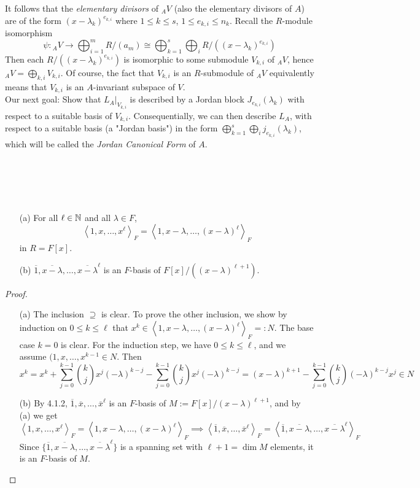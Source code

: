 \documentclass[11pt]{book}
\theoremstyle{definition}   \newtheorem{defn}[counter]{Definition} %
\newcommand{\ov}{\overline}   \newcommand{\wt}{\widetilde}
\newcommand{\gen}[1]{\left\langle #1 \right\rangle}   \newcommand{\stab}[2]{\tn{Stab}_{#1}(#2)}   \newcommand{\fix}[2]{\tn{Fix}_{#1}(#2)}   \newcommand{\op}{^{\tn{op}}}
\DeclareMathOperator{\ra}{\rightarrow}   \DeclareMathOperator{\Poly}{\mathbf{P}}   \DeclareMathOperator{\spn}{\textnormal{span}}   \DeclareMathOperator{\aut}{\textnormal{Aut}}
\newcommand{\vs}{\vspace{8pt}}
\numberwithin{counter}{chapter}
\begin{document}
It follows that the \emph{elementary divisors} of ${_AV}$ (also the elementary divisors of $A$) are of the form $(x-\lambda_k)^{e_{k,i}}$ where $1 \leq k \leq s$, $1 \leq e_{k,i} \leq n_k$. Recall the $R$-module isomorphism 
	\[\psi : {_AV} \ra \bigoplus_{i=1}^m R/(a_m) \cong \bigoplus_{k=1}^s \bigoplus_{i} R/((x-\lambda_k)^{e_{k,i}}) \]
Then each $R/((x-\lambda_k)^{e_{k,i}})$ is isomorphic to some submodule $V_{k,i}$ of ${_AV}$, hence ${_AV} = \bigoplus_{k,i} V_{k,i}$. Of course, the fact that $V_{k,i}$ is an $R$-submodule of ${_AV}$ equivalently means that $V_{k,i}$ is an $A$-invariant subspace of $V$. \\

Our next goal: Show that $L_A|_{V_{k,i}}$ is described by a Jordan block $J_{e_{k,i}}(\lambda_k)$ with respect to a suitable basis of $V_{k,i}$. Consequentially, we can then describe $L_A$, with respect to a suitable basis (a "Jordan basis") in the form $\bigoplus_{k=1}^s \bigoplus_i j_{e_{k,i}}(\lambda_k)$, which will be called the \emph{Jordan Canonical Form} of $A$. 

\vs \vs \ \\ \ \\

\begin{lemma}\ 
\begin{enumerate}
\item[(a)] For all $\ell \in \operatorname{\mathbb{N}}$ and all $\lambda \in F$, 
	\[\gen{1,x,\dots,x^\ell}_F = \gen{1,x-\lambda,\dots,(x-\lambda)^\ell}_F \]
in $R = F[x]$.
\item[(b)] $\ov{1},\ov{x-\lambda},\dots,\ov{x-\lambda}^\ell$ is an $F$-basis of $F[x]/((x-\lambda)^{\ell+1})$. 
\end{enumerate}
\end{lemma}

\begin{proof} \ 
\begin{enumerate}
\item[(a)] The inclusion $\supseteq$ is clear. To prove the other inclusion, we show by induction on $0 \leq k \leq \ell$ that $x^k \in \gen{1,x-\lambda,\dots,(x-\lambda)^\ell}_F =: N$. The base case $k = 0$ is clear. For the induction step, we have $0 \leq k \leq \ell$, and we assume $(1,x,\dots,x^{k-1} \in N$. Then
	\[x^{k} = x^{k} + \sum_{j=0}^{k-1} {k \choose j} x^j (-\lambda)^{k-j} - \sum_{j=0}^{k-1} {k \choose j} x^j (-\lambda)^{k-j} = (x-\lambda)^{k+1} - \sum_{j=0}^{k-1} {k \choose j}(-\lambda)^{k-j} x^j \in N \]

\item[(b)] By 4.1.2, $\ov{1},\ov{x},\dots,\ov{x}^\ell$ is an $F$-basis of $M := F[x]/(x-\lambda)^{\ell+1}$, and by (a) we get 
	\[\gen{1,x,\dots,x^\ell}_F = \gen{1,x-\lambda,\dots,(x-\lambda)^\ell}_F \implies \gen{\ov{1},\ov{x},\dots,\ov{x}^\ell}_F = \gen{\ov{1},\ov{x-\lambda},\dots,\ov{x-\lambda}^\ell}_F \]
Since $\{\ov{1},\ov{x-\lambda},\dots,\ov{x-\lambda}^\ell\}$ is a spanning set with $\ell+1 = \dim M$ elements, it is an $F$-basis of $M$. 
\end{enumerate}
\end{proof}
\end{document}
